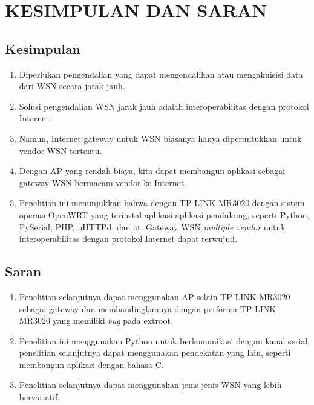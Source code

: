 
\chapter{KESIMPULAN DAN SARAN}

\section{Kesimpulan}
	\begin{enumerate}
		\item Diperlukan pengendalian yang dapat mengendalikan atau mengakuisisi data dari WSN secara jarak jauh.
		\item Solusi pengendalian WSN jarak jauh adalah interoperabilitas dengan protokol Internet.
		\item Namun, Internet gateway untuk WSN biasanya hanya diperuntukkan untuk vendor WSN tertentu.
		\item Dengan AP yang rendah biaya, kita dapat membangun aplikasi sebagai gateway WSN bermacam vendor ke Internet.
		\item Penelitian ini menunjukkan bahwa dengan TP-LINK MR3020 dengan sistem operasi OpenWRT yang terinstal aplikasi-aplikasi pendukung, seperti Python, PySerial, PHP, uHTTPd, dan at, Gateway WSN \emph{multiple vendor} untuk interoperabilitas dengan protokol Internet dapat terwujud.
	\end{enumerate}


\section{Saran}
	\begin{enumerate}
		\item Penelitian selanjutnya dapat menggunakan AP selain TP-LINK MR3020 sebagai gateway dan membandingkannya dengan performa TP-LINK MR3020 yang memiliki \emph{bug} pada extroot.
		\item Penelitian ini menggunakan Python untuk berkomunikasi dengan kanal serial, penelitian selanjutnya dapat menggunakan pendekatan yang lain, seperti membangun aplikasi dengan bahasa C.
		\item Penelitian selanjutnya dapat menggunakan jenis-jenis WSN yang lebih bervariatif.
	\end{enumerate}

	